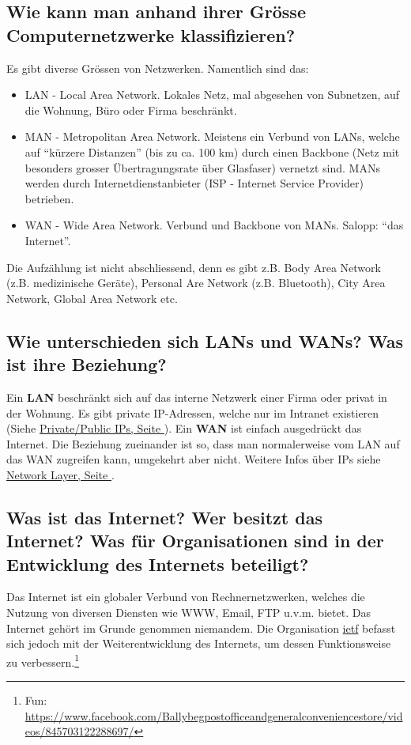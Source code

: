 \subsection*{Wie kann man anhand ihrer Grösse Computernetzwerke klassifizieren?}
Es gibt diverse Grössen von Netzwerken. Namentlich sind das:
\begin{itemize}
    \item LAN\label{LAN} - Local Area Network. Lokales Netz, mal abgesehen von Subnetzen, auf die Wohnung, Büro oder Firma beschränkt.
    \item MAN\label{MAN} - Metropolitan Area Network. Meistens ein Verbund von LANs, welche auf ``kürzere Distanzen'' (bis zu ca. 100 km) durch einen Backbone (Netz mit besonders grosser Übertragungsrate über Glasfaser) vernetzt sind. MANs werden durch Internetdienstanbieter (ISP - Internet Service Provider) betrieben.
    \item WAN\label{WAN} - Wide Area Network. Verbund und Backbone von MANs. Salopp: ``das Internet''.
\end{itemize}
Die Aufzählung ist nicht abschliessend, denn es gibt z.B. Body Area Network (z.B. medizinische Geräte), Personal Are Network (z.B. Bluetooth), City Area Network, Global Area Network etc.

\subsection*{Wie unterschieden sich LANs und WANs? Was ist ihre Beziehung?}
Ein \textbf{LAN} beschränkt sich auf das interne Netzwerk einer Firma oder privat in der Wohnung. Es gibt private IP-Adressen, welche nur im Intranet existieren (Siehe \underline{\hyperref[sub:private_public_IP]{Private/Public IPs, Seite \pageref{sub:private_public_IP}}}). Ein \textbf{WAN} ist einfach ausgedrückt das Internet. Die Beziehung zueinander ist so, dass man normalerweise vom LAN auf das WAN zugreifen kann, umgekehrt aber nicht. Weitere Infos über IPs siehe \underline{\hyperref[part:sw0506]{Network Layer, Seite \pageref{part:sw0506}}}.


\subsection*{Was ist das Internet? Wer besitzt das Internet? Was für Organisationen sind in der Entwicklung des Internets beteiligt?}
Das Internet ist ein globaler Verbund von Rechnernetzwerken, welches die Nutzung von diversen Diensten wie WWW, Email, FTP u.v.m. bietet. Das Internet gehört im Grunde genommen niemandem. Die Organisation \underline{\acrshort{ietf}} befasst sich jedoch mit der Weiterentwicklung des Internets, um dessen Funktionsweise zu verbessern.\footnote{Fun: \url{https://www.facebook.com/Ballybegpostofficeandgeneralconveniencestore/videos/845703122288697/}}
